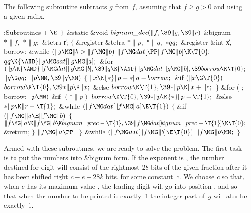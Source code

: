 The following subroutine subtracts $g$ from~$f$, assuming that
$f\ge g>0$ and using a given radix.

\Y\B\4:Subroutines\X${}\mathrel+\E{}$\6
\&{static} \&{void} ${}\\{bignum\_dec}(\|f,\39\|g,\39\|r){}$\1\1\6
\&{bignum} ${}{*}\|f,{}$ ${}{*}\|g;{}$\6
\&{tetra} \|r;\2\2\6
${}\{{}$\1\6
\&{register} \&{tetra} ${}{*}\|p,{}$ ${}{*}\|q,{}$ ${}{*}\\{qq};{}$\6
\&{register} \&{int} \|x${},{}$ \\{borrow};\7
\&{while} ${}(\|g\MG\|b>\|f\MG\|b){}$\1\5
${}\|f\MG\\{dat}[\PP\|f\MG\|b]\K\T{0};{}$\2\6
${}\\{qq}\K{\AND}\|g\MG\\{dat}[\|g\MG\|a];{}$\6
\&{for} ${}(\|p\K{\AND}\|f\MG\\{dat}[\|g\MG\|b],\39\|q\K{\AND}\|g\MG\\{dat}[\|g%
\MG\|b],\39\\{borrow}\K\T{0};{}$ ${}\|q\G\\{qq};{}$ ${}\|p\MM,\39\|q\MM){}$\5
${}\{{}$\1\6
${}\|x\K{*}\|p-{*}\|q-\\{borrow};{}$\6
\&{if} ${}(\|x\G\T{0}){}$\1\5
${}\\{borrow}\K\T{0},\39{*}\|p\K\|x;{}$\2\6
\&{else}\1\5
${}\\{borrow}\K\T{1},\39{*}\|p\K\|x+\|r;{}$\2\6
\4${}\}{}$\2\6
\&{for} ( ; \\{borrow}; ${}\|p\MM){}$\1\6
\&{if} ${}({*}\|p){}$\1\5
${}\\{borrow}\K\T{0},\39{*}\|p\K{*}\|p-\T{1};{}$\2\6
\&{else}\1\5
${}{*}\|p\K\|r-\T{1};{}$\2\2\6
\&{while} ${}(\|f\MG\\{dat}[\|f\MG\|a]\E\T{0}){}$\5
${}\{{}$\1\6
\&{if} ${}(\|f\MG\|a\E\|f\MG\|b){}$\5
${}\{{}$\1\6
${}\|f\MG\|a\K\|f\MG\|b\K\\{bignum\_prec}-\T{1},\39\|f\MG\\{dat}[\\{bignum%
\_prec}-\T{1}]\K\T{0};{}$\6
\&{return};\6
\4${}\}{}$\2\6
${}\|f\MG\|a\PP;{}$\6
\4${}\}{}$\2\6
\&{while} ${}(\|f\MG\\{dat}[\|f\MG\|b]\E\T{0}){}$\1\5
${}\|f\MG\|b\MM;{}$\2\6
\4${}\}{}$\2\par
\fi

Armed with these subroutines, we are ready to solve the problem.
The first task is to put the numbers into \&{bignum} form.
If the exponent is , the number destined for digit 
will
consist of the rightmost 28 bits of the given fraction after it has
been shifted right $c-e-28k$ bits, for some constant~$c$.
We choose $c$ so that,
when $e$ has its maximum value , the leading digit will
go into position , and so that when the number to be printed
is exactly~1 the integer part of~$g$ will also be exactly~1.

